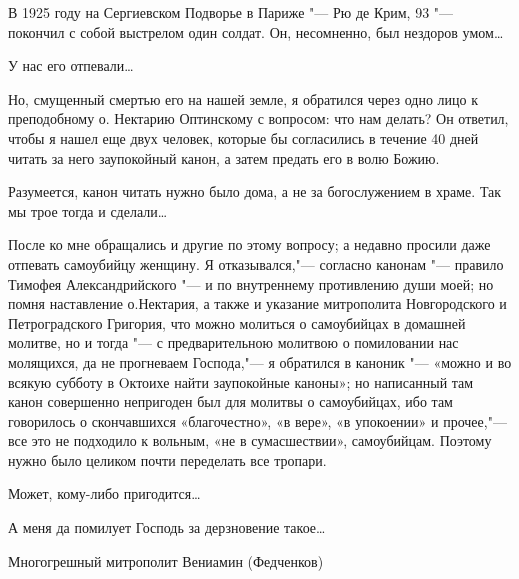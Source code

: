 \mychapterending



{\centering {}

}

\begin{mymulticols}

В 1925 году на Сергиевском Подворье в Париже "--- Рю де Крим, 93 "--- покончил с собой выстрелом один солдат. Он, несомненно, был нездоров умом…

У нас его отпевали…

Но, смущенный смертью его на нашей земле, я обратился через одно лицо к преподобному о. Нектарию Оптинскому с вопросом: что нам делать? Он ответил, чтобы я нашел еще двух человек, которые бы согласились в течение 40 дней читать за него заупокойный канон, а затем предать его в волю Божию.

Разумеется, канон читать нужно было дома, а не за богослужением в храме. Так мы трое тогда и сделали…

После ко мне обращались и другие по этому вопросу; а недавно просили даже отпевать самоубийцу женщину. Я отказывался,"--- согласно канонам "--- правило Тимофея Александрийского "--- и по внутреннему противлению души моей; но помня наставление о.Нектария, а также и указание митрополита Новгородского и Петроградского Григория, что можно молиться о самоубийцах в домашней молитве, но и тогда "--- с предварительною молитвою о помиловании нас молящихся, да не прогневаем Господа,"--- я обратился в каноник "--- «можно и во всякую субботу в Oктоихе найти заупокойные каноны»; но написанный там канон совершенно непригоден был для молитвы о самоубийцах, ибо там говорилось о скончавшихся «благочестно», «в вере», «в упокоении» и прочее,"--- все это не подходило к вольным, «не в сумасшествии», самоубийцам. Поэтому нужно было целиком почти переделать все тропари.

Может, кому-либо пригодится…

А меня да помилует Господь за дерзновение такое…

Многогрешный митрополит Вениамин (Федченков)

 {\centering {}

}



\end{mymulticols}
